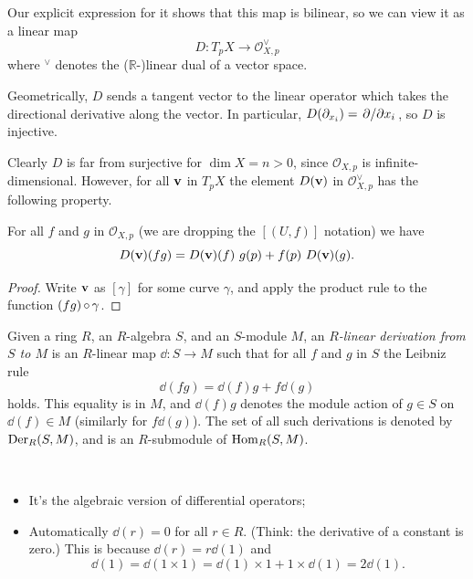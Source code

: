 \documentclass[a4paper,11pt]{article}
\begin{document}
	Our explicit expression for it shows that this map is bilinear, so we can view it as a linear map
	\[
		D : T_p X \to \mathcal{O}_{X,p}^{\vee}
	\]
	where $^{\vee}$ denotes the ($\mathbb{R}$-)linear dual of a vector space.

	Geometrically, $D$ sends a tangent vector to the linear operator which takes the directional derivative along the vector. In particular, $D(\partial_{x_i}) = \pdv*{x_i}$, so $D$ is injective.
	
	Clearly $D$ is far from surjective for $\dim X = n > 0$, since $\mathcal{O}_{X,p}$ is infinite-dimensional. However, for all $\vb v$ in $T_p X$ the element $D(\vb v)$ in $\mathcal{O}_{X,p}^{\vee}$ has the following property.

	\begin{lem}
		For all $f$ and $g$ in $\mathcal{O}_{X,p}$ (we are dropping the $[(U,f)]$ notation) we have
		\[
			D(\vb v) (fg) = D(\vb v)(f)\ g(p) + f(p)\ D(\vb v)(g).
		\]
		\label{lem:1.59}
	\end{lem}
	\begin{proof}
		Write $\vb v$ as $[\gamma]$ for some curve $\gamma$, and apply the product rule to the function $(fg)\operatorname{\circ} \gamma$.
	\end{proof}

	\begin{defi}
		Given a ring $R$, an $R$-algebra $S$, and an $S$-module $M$, an \emph{$R$-linear derivation from $S$ to $M$} is an $R$-linear map $\dd : S \to M$ such that for all $f$ and $g$ in $S$ the Leibniz rule
		\[
			\dd{(fg)} = \dd{(f)} g + f \dd{(g)}
		\]
		holds. This equality is in $M$, and $\dd{(f)}g$ denotes the module action of $g \in S$ on $\dd{(f)} \in M$ (similarly for $f \dd{(g)}$). The set of all such derivations is denoted by $\operatorname{Der}_R (S,M)$, and is an $R$-submodule of $\operatorname{Hom}_R (S,M)$.
	\end{defi}

	\begin{rmk}
		\ 
		\begin{itemize}
			\item It's the algebraic version of differential operators;
			\item Automatically $\dd{(r)} = 0$ for all $r\in R$. (Think: the derivative of a constant is zero.) This is because $\dd{(r)} = r \dd{(1)}$ and \[
				\dd{(1)} = \dd{(1 \times 1)} = \dd{(1)} \times 1 + 1 \times \dd{(1)} = 2 \dd{(1)}.
			\]
		\end{itemize}
	\end{rmk}
\end{document}
